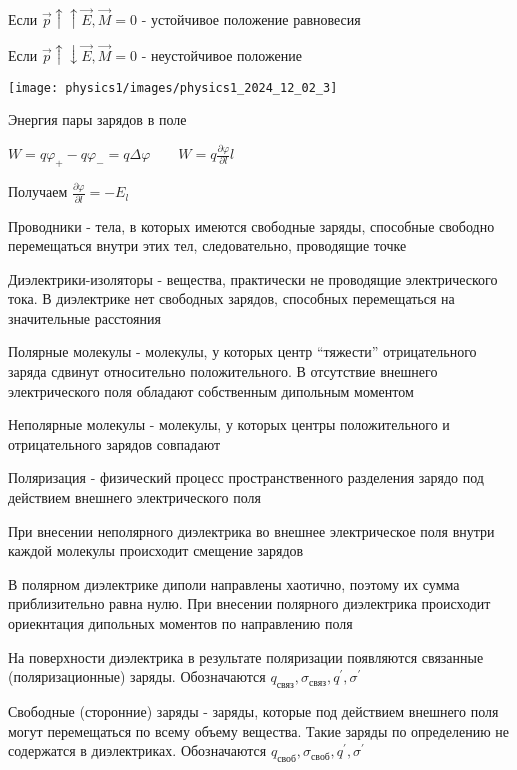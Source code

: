\documentclass[12pt]{article}
\begin{document}
Если $\vec{p} \uparrow\uparrow \vec{E}, \vec{M} = 0$ - устойчивое положение равновесия

Если $\vec{p} \uparrow\downarrow \vec{E}, \vec{M} = 0$ - неустойчивое положение

\begin{center}
    \texttt{[image: physics1/images/physics1\_2024\_12\_02\_3]}
\end{center}


Энергия пары зарядов в поле

$W = q \varphi_+ - q\varphi_- = q\Delta\varphi \qquad W = q\frac{\partial \varphi}{\partial l}l$

Получаем $\frac{\partial \varphi}{\partial l} = -E_l$

\Def Проводники - тела, в которых имеются свободные заряды, способные свободно перемещаться внутри этих тел, следовательно,
проводящие точке

\Def Диэлектрики-изоляторы - вещества, практически не проводящие электрического тока. В диэлектрике нет 
свободных зарядов, способных перемещаться на значительные расстояния

\Def Полярные молекулы - молекулы, у которых центр \enquote{тяжести} отрицательного заряда сдвинут относительно положительного. 
В отсутствие внешнего электрического поля обладают собственным дипольным моментом

\Def Неполярные молекулы - молекулы, у которых центры положительного и отрицательного зарядов совпадают

\Def Поляризация - физический процесс пространственного разделения зарядо под действием внешнего электрического поля

При внесении неполярного диэлектрика во внешнее электрическое поля внутри каждой молекулы происходит смещение зарядов

В полярном диэлектрике диполи направлены хаотично, поэтому их сумма приблизительно равна нулю. 
При внесении полярного диэлектрика происходит ориекнтация дипольных моментов по направлению поля

На поверхности диэлектрика в результате поляризации появляются связанные (поляризационные) заряды. Обозначаются 
$q_\text{связ}, \sigma_\text{связ}, q^\prime, \sigma^\prime$

Свободные (сторонние) заряды - заряды, которые под действием внешнего поля могут перемещаться по всему объему 
вещества. Такие заряды по определению не содержатся в диэлектриках. 
Обозначаются $q_\text{своб}, \sigma_\text{своб}, q^\prime, \sigma^\prime$
\end{document}

